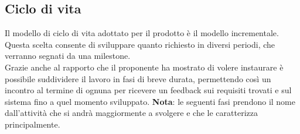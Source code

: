 	\subsection{Ciclo di vita}
	Il modello di ciclo di vita adottato per il prodotto è il modello incrementale. \\
	Questa scelta consente di sviluppare quanto richiesto in diversi periodi, che verranno segnati da una milestone. \\
	Grazie anche al rapporto che il proponente ha mostrato di volere instaurare è possibile suddividere il lavoro in fasi di breve durata, permettendo così un incontro al termine di ognuna per ricevere un feedback sui requisiti trovati e sul sistema fino a quel momento sviluppato. \newline
	\textbf{Nota}: le seguenti fasi prendono il nome dall'attività che si andrà maggiormente a svolgere e che le caratterizza principalmente.
